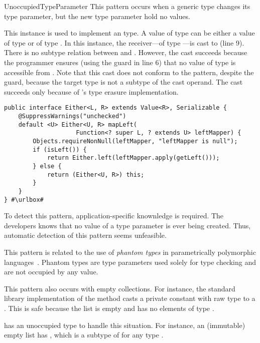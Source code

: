 \begin{pattern}{UnoccupiedTypeParameter}
This pattern occurs when a generic type changes its type parameter,
but the new type parameter hold no values.

\instances{}
This instance is used to implement an  type.
A value of type  can be either a value of type  or of type .
In this instance, the receiver---of type ---is cast to  (line 9).
There is no subtype relation between  and .
However, the cast succeeds because the programmer ensures
(using the guard  in line 6)
that no value of type  is accessible from .
Note that this cast does not conform to the 
pattern, despite the guard, because the target type is not a subtype of the
cast operand.
The cast succeeds only because of \java{}'s type erasure
implementation.

\def\urlvar{http://bit.ly/vavr_io_vavr_2SMIfI2}
\begin{verbatim}
public interface Either<L, R> extends Value<R>, Serializable {
    @SuppressWarnings("unchecked")
    default <U> Either<U, R> mapLeft(
                    Function<? super L, ? extends U> leftMapper) {
        Objects.requireNonNull(leftMapper, "leftMapper is null");
        if (isLeft()) {
            return Either.left(leftMapper.apply(getLeft()));
        } else {
            return (Either<U, R>) this;
        }
    }
} #\urlbox#
\end{verbatim}


\detection{}
To detect this pattern, application-specific knownledge is required.
The developers knows that no value of a type parameter is ever being created. 
Thus, automatic detection of this pattern seems unfeasible.

\issues{}
This pattern is related to the use of \emph{phantom types} in parametrically polymorphic languages~\citep{LeijenMeijer99,cheneyHinzePhantomTypes}.
Phantom types are type parameters used solely for type checking and are not occupied by any value.

This pattern also occurs with empty collections.
For instance, the \java{} standard library implementation of the method  casts a private constant with raw type  to a .
This is safe because the list is empty and has no elements of type .

\scala{} has an unoccupied  type to handle this situation.
For instance, an (immutable) empty list has ,
which is a subtype of  for any type .

\end{pattern}